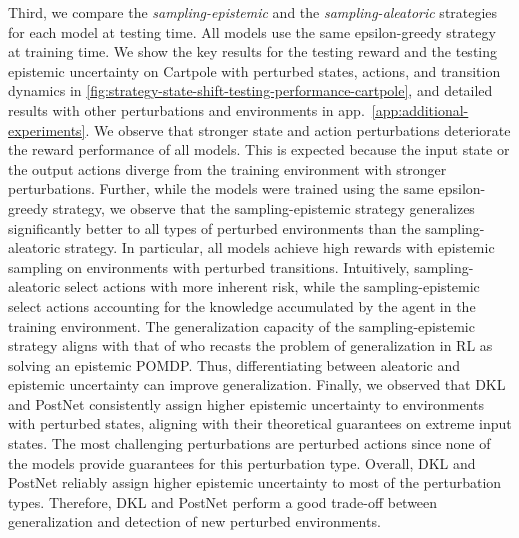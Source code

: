 %
%


Third, we compare the \emph{sampling-epistemic} and the \emph{sampling-aleatoric} strategies for each model at testing time. All models use the same epsilon-greedy strategy at training time. We show the key results for the testing reward and the testing epistemic uncertainty on Cartpole with perturbed states, actions, and transition dynamics in \cref{fig:strategy-state-shift-testing-performance-cartpole}, and detailed results with other perturbations and environments 
in app.~\ref{app:additional-experiments}. We observe that stronger state and action perturbations deteriorate the reward performance of all models. This is expected because the input state or the output actions diverge from the training environment with stronger perturbations. Further, while the models were trained using the same epsilon-greedy strategy, we observe that the sampling-epistemic strategy generalizes significantly better to all types of perturbed environments than the sampling-aleatoric strategy. In particular, all models achieve high rewards with epistemic sampling on environments with perturbed transitions. Intuitively, sampling-aleatoric select actions with more inherent risk, while the sampling-epistemic select actions accounting for the knowledge accumulated by the agent in the training environment. The generalization capacity of the sampling-epistemic strategy aligns with that of \citet{epistemic-pomdp} who recasts the problem of generalization in RL as solving an epistemic POMDP. Thus, differentiating between aleatoric and epistemic uncertainty can improve generalization. Finally, we observed that DKL and PostNet consistently assign higher epistemic uncertainty to environments with perturbed states, aligning with their theoretical guarantees on extreme input states. The most challenging perturbations are perturbed actions since none of the models provide guarantees for this perturbation type. Overall, DKL and PostNet reliably assign higher epistemic uncertainty to most of the perturbation types. Therefore, DKL and PostNet perform a good trade-off between generalization and detection of new perturbed environments.

 
%
%